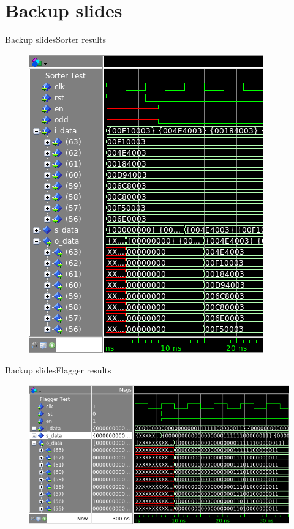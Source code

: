 \documentclass{beamer}
\begin{document}
\section*{Backup slides}
\begin{frame}{Backup slides}{Sorter results}
  \begin{figure}
    \begin{center}
      \includegraphics[height=0.6\textheight]{figs/sorter-test}
    \end{center}
  \end{figure}
\end{frame}

\begin{frame}{Backup slides}{Flagger results}
  \begin{figure}
    \begin{center}
      \includegraphics[height=0.6\textheight]{figs/flagger-test}
    \end{center}
  \end{figure}
\end{frame}
\end{document}
